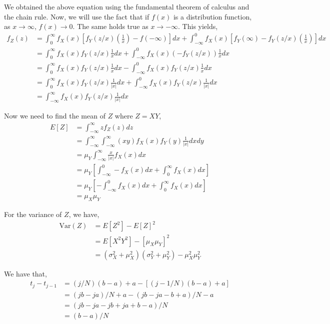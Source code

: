 \documentclass[12pt]{article}
\newenvironment{problem}[2][Problem]{\begin{trivlist}
\item[\hskip \labelsep {\bfseries #1}\hskip \labelsep {\bfseries #2.}]}{\end{trivlist}}
\begin{document}
We obtained the above equation using the fundamental theorem of calculus and the chain rule. Now, we will use the fact that if $f(x)$ is a distribution function, as $x \to \infty$, $f(x) \to 0$. The same holds true as $x \to -\infty$. This yields,
\begin{align*}
f_Z(z) &= \int_{0}^{\infty} f_X(x) \left[f_Y(z/x)\left(\frac{1}{x}\right) - f(-\infty)\right] dx + \int_{-\infty}^{0} f_X(x) \left[f_Y(\infty) - f_Y(z/x)\left(\frac{1}{x}\right)\right] dx\\
&= \int_{0}^{\infty} f_X(x)f_Y(z/x)\frac{1}{x} dx + \int_{-\infty}^{0} f_X(x)(-f_Y(z/x))\frac{1}{x} dx\\
&= \int_{0}^{\infty} f_X(x)f_Y(z/x)\frac{1}{x} dx - \int_{-\infty}^{0} f_X(x)f_Y(z/x)\frac{1}{x} dx\\
&= \int_{0}^{\infty} f_X(x)f_Y(z/x)\frac{1}{|x|} dx + \int_{-\infty}^{0} f_X(x)f_Y(z/x)\frac{1}{|x|} dx\\
&= \int_{-\infty}^{\infty} f_X(x)f_Y(z/x)\frac{1}{|x|} dx
\end{align*}

Now we need to find the mean of $Z$ where $Z = XY$,
\begin{align*}
E[Z] &= \int_{-\infty}^{\infty} zf_Z(z)dz\\
&= \int_{-\infty}^{\infty} \int_{-\infty}^{\infty} (xy)f_X(x)f_Y(y)\frac{1}{|x|} dxdy\\
&= \mu_Y \int_{-\infty}^{\infty} \frac{x}{|x|}f_X(x)dx\\
&= \mu_Y \left[\int_{-\infty}^0 - f_X(x) dx + \int_{0}^{\infty} f_X(x) dx\right]\\
&= \mu_Y \left[-\int_{-\infty}^0 f_X(x) dx + \int_{0}^{\infty} f_X(x) dx\right]\\
&= \mu_X \mu_Y
\end{align*}

For the variance of $Z$, we have,
\begin{align*}
\text{Var}(Z) &= E[Z^2] - E[Z]^2\\
&= E[X^2Y^2] - [\mu_X \mu_Y]^2\\
&= (\sigma_X^2 + \mu_X^2)(\sigma_Y^2 + \mu_Y^2) - \mu_X^2 \mu_Y^2
\end{align*}

\begin{problem}{9}
\end{problem}

We have that,
\begin{align*}
t_j - t_{j-1} &= (j/N)(b-a) + a - [(j-1/N)(b-a) + a]\\
&= (jb - ja)/N + a - (jb - ja - b + a)/N - a\\
&= (jb - ja - jb + ja + b - a)/N\\
&= (b - a)/N
\end{align*}
\end{document}
